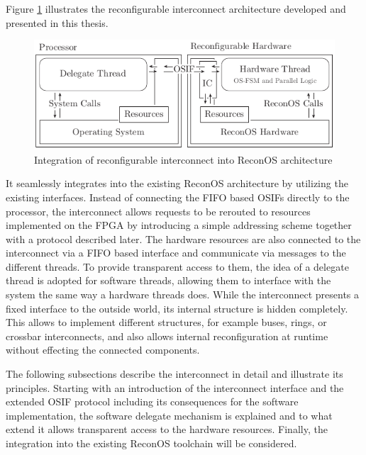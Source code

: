 Figure \ref{fig:interconnect} illustrates the reconfigurable interconnect
architecture developed and presented in this thesis.
\begin{figure}[tb]
	\centering
	\includegraphics{../figures/interconnect}
	\caption{Integration of reconfigurable interconnect into ReconOS architecture}
	\label{fig:interconnect}
\end{figure}
It seamlessly integrates into the existing ReconOS architecture by utilizing
the existing interfaces. Instead of connecting the \ac{FIFO} based \acp{OSIF}
directly to the processor, the interconnect allows requests to be rerouted to
resources implemented on the \ac{FPGA} by introducing a simple addressing
scheme together with a protocol described later. The hardware resources are
also connected to the interconnect via a \ac{FIFO} based interface and
communicate via messages to the different threads. To provide transparent
access to them, the idea of a delegate thread is adopted for software threads,
allowing them to interface with the system the same way a hardware threads
does. While the interconnect presents a fixed interface to the outside world,
its internal structure is hidden completely. This allows to implement
different structures, for example buses, rings, or crossbar interconnects, and
also allows internal reconfiguration at runtime without effecting the
connected components.

The following subsections describe the interconnect in detail and illustrate
its principles. Starting with an introduction of the interconnect interface
and the extended \ac{OSIF} protocol including its consequences for the
software implementation, the software delegate mechanism is explained and to
what extend it allows transparent access to the hardware resources. Finally,
the integration into the existing ReconOS toolchain will be considered.

